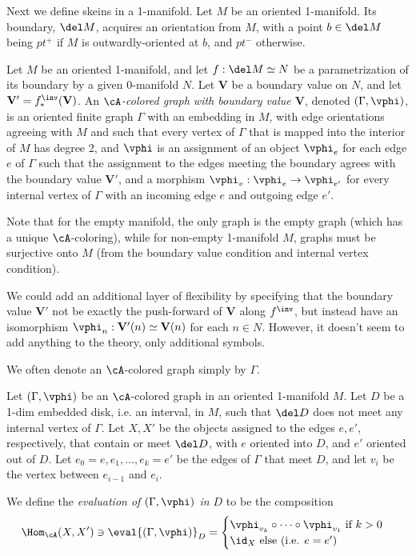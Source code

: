 \documentclass[12pt]{article}
\newcommand{\VV}{{\mathbf{V}}}
\begin{document}
Next we define skeins in a 1-manifold.
Let $M$ be an oriented 1-manifold.
Its boundary, $\del M$, acquires an orientation from $M$,
with a point $b \in \del M$ being $pt^+$ if $M$
is outwardly-oriented at $b$, and $pt^-$ otherwise.

\begin{definition}
\label{d:A-colored-graph}
Let $M$ be an oriented 1-manifold,
and let $f: \del M \simeq N$
be a parametrization of its boundary by a given 0-manifold $N$.
Let $\VV$ be a boundary value on $N$,
and let $\VV' = f_*^\inv(\VV)$.
An \emph{$\cA$-colored graph with boundary value $\VV$},
denoted $(\Gamma,\vphi)$,
is an oriented finite graph $\Gamma$ with an embedding in $M$,
with edge orientations agreeing with $M$
and such that every vertex of $\Gamma$
that is mapped into the interior of $M$ has degree 2,
and $\vphi$ is an assignment of an object $\vphi_e$
for each edge $e$ of $\Gamma$
such that the assignment to the edges meeting the boundary
agrees with the boundary value $\VV'$,
and a morphism $\vphi_v: \vphi_e \to \vphi_{e'}$
for every internal vertex of $\Gamma$
with an incoming edge $e$ and outgoing edge $e'$.
\end{definition}

Note that for the empty manifold, the only graph is the empty graph
(which has a unique $\cA$-coloring),
while for non-empty 1-manifold $M$,
graphs must be surjective onto $M$
(from the boundary value condition and internal vertex condition).

\begin{remark}
We could add an additional layer of flexibility
by specifying that the boundary value $\VV'$
not be exactly the push-forward of $\VV$ along $f^\inv$,
but instead have an isomorphism
$\vphi_n : \VV'(n) \simeq \VV(n)$ for each $n \in N$.
However, it doesn't seem to add anything to the theory,
only additional symbols.
\end{remark}

We often denote an $\cA$-colored graph simply by $\Gamma$.

\begin{definition}
\label{d:local-ev}
Let $(\Gamma,\vphi)$ be an $\cA$-colored graph
in an oriented 1-manifold $M$.
Let $D$ be a 1-dim embedded disk, i.e. an interval, in $M$,
such that $\del D$ does not meet any internal vertex of $\Gamma$.
Let $X,X'$ be the objects assigned to the edges $e,e'$,
respectively, that contain or meet $\del D$,
with $e$ oriented into $D$, and $e'$ oriented out of $D$.
Let $e_0 = e, e_1,\ldots,e_k = e'$ be the edges
of $\Gamma$ that meet $D$, and let
$v_i$ be the vertex between $e_{i-1}$ and $e_i$.

We define the \emph{evaluation of $(\Gamma,\vphi)$ in $D$}
to be the composition
\[
\Hom_\cA(X,X') \ni
\eval{(\Gamma,\vphi)}_D
=
\begin{cases}
\vphi_{v_k} \circ \cdots \circ \vphi_{v_1}
\textrm{ if } k >0
\\
\id_X \textrm{ else (i.e. } e = e')
\end{cases}
\]
\end{definition}
\end{document}
